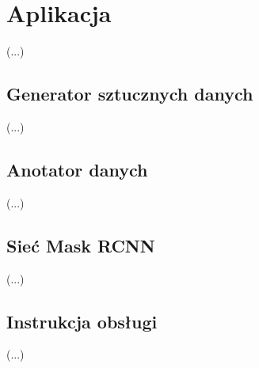 \chapter{Aplikacja}

(...)

\section{Generator sztucznych danych}

(...)

\section{Anotator danych}

(...)

\section{Sieć Mask RCNN}

(...)

\section{Instrukcja obsługi}

(...)
